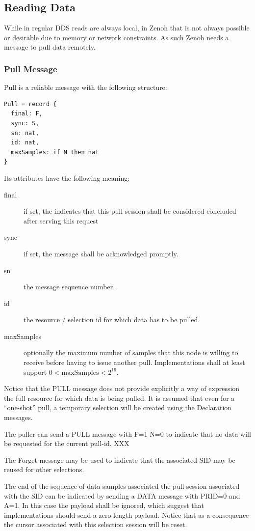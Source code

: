 \documentclass[a4paper,oneside,article]{memoir}
\begin{document}
\subsection{Reading Data}

While in regular DDS reads are always local, in Zenoh that is not always possible or desirable
due to memory or network constraints.  As such Zenoh needs a message to pull data remotely.

\subsubsection{Pull Message}
Pull is a reliable message with the following structure:
\begin{verbatim}
Pull = record {
  final: F,
  sync: S,
  sn: nat,
  id: nat,
  maxSamples: if N then nat
}
\end{verbatim}
Its attributes have the following meaning:
\begin{description}
\item[final] if set, the indicates that this pull-session shall be considered concluded after serving this request
\item[sync] if set, the message shall be acknowledged promptly.
\item[sn] the message sequence number.
\item[id] the resource / selection id for which data has to be pulled.
\item[maxSamples] optionally the maximum number of samples that this node is willing to receive
  before having to issue another pull.  Implementations shall at least support
  $0 < \mathrm{maxSamples} < 2^{16}$.
\end{description}

Notice that the PULL message does not provide explicitly a way of expression the full resource for
which data is being pulled.  It is assumed that even for a “one-shot” pull, a temporary selection
will be created using the Declaration messages.

The puller can send a PULL message with F=1 N=0 to indicate that no data will be requested for the
current pull-id. XXX

The Forget message may be used to indicate that the associated SID may be reused for other selections.

The end of the sequence of data samples associated the pull session associated with the SID can be
indicated by sending a DATA message with PRID=0 and A=1.  In this case the payload shall be ignored,
which suggest that implementations should send a zero-length payload. Notice that as a consequence
the cursor associated with this selection session will be reset.
\end{document}
